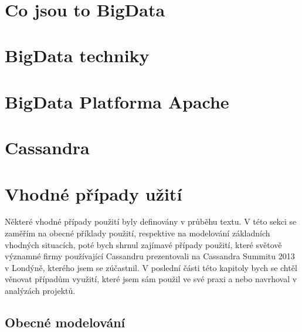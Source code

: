\documentclass[thesis=M,czech]{FITthesis}[2012/06/26]
\title{
}
\begin{document}
	

\begin{introduction}




\end{introduction}


\chapter{Co jsou to BigData}




\chapter{BigData techniky}



\chapter{BigData Platforma Apache}



\chapter{Cassandra}	




\chapter{Vhodné případy užití}
Některé vhodné případy použití byly definovány v průběhu textu. V této sekci se zaměřím na obecné příklady použití, respektive na modelování základních vhodných situacích, poté bych shrnul zajímavé případy použití, které světově významné firmy používající Cassandru prezentovali na Cassandra Summitu 2013 v Londýně, kterého jsem se zúčastnil. V poslední části této kapitoly bych se chtěl věnovat případům využití, které jsem sám použil ve své praxi a nebo navrhoval v analýzách projektů. 

\section{Obecné modelování}
\end{document}
